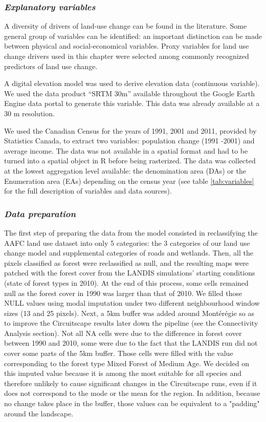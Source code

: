 \subsubsection*{\textit{Explanatory variables}}

A diversity of drivers of land-use change can be found in the literature. Some general group of variables can be identified: an important distinction can be made between physical and social-economical variables. Proxy variables for land use change drivers used in this chapter were selected among commonly recognized predictors of land use change.

A digital elevation model was used to derive elevation data (continuous variable). We used the data product “SRTM 30m” available throughout the Google Earth Engine data portal to generate this variable. This data was already available at a 30 m resolution.

We used the Canadian Census for the years of 1991, 2001 and 2011, provided by Statistics Canada, to extract two variables: population change (1991 -2001) and average income. The data was not available in a spatial format and had to be turned into a spatial object in R before being rasterized. The data was collected at the lowest aggregation level available: the denomination area (DAs) or the Enumeration area (EAs) depending on the census year (see table \ref{tab:variables} for the full description of variables and data sources).\\

\subsubsection*{\textit{Data preparation}}

The first step of preparing the data from the model consisted in reclassifying the AAFC land use dataset into only 5 categories: the 3 categories of our land use change model and supplemental categories of roads and wetlands. Then, all the pixels classified as forest were reclassified as null, and the resulting maps were patched with the forest cover from the LANDIS simulations' starting conditions (state of forest types in 2010). At the end of this process, some cells remained null as the forest cover in 1990 was larger than that of 2010. We filled those NULL values using modal imputation under two different neighbourhood window sizes (13 and 25 pixels). Next, a 5km buffer was added around Montérégie so as to improve the Circuitscape results later down the pipeline (see the Connectivity Analysis section). Not all NA cells were due to the difference in forest cover between 1990 and 2010, some were due to the fact that the LANDIS run did not cover some parts of the 5km buffer. Those cells were filled with the value corresponding to the forest type Mixed Forest of Medium Age. We decided on this imputed value because it is among the most suitable for all species and therefore unlikely to cause significant changes in the Circuitscape runs, even if it does not correspond to the mode or the mean for the region. In addition, because no change takes place in the buffer, those values can be equivalent to a "padding" around the landscape.

